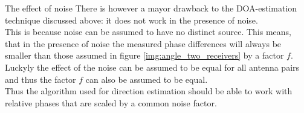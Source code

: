 \begin{subchapter}{The effect of noise}
  There is however a mayor drawback to the DOA-estimation
  technique discussed above: it does not work in the presence of noise. \\

  This is because noise can be assumed to have no distinct source.
  This means, that in the presence of noise the measured phase differences
  will always be smaller than those assumed in figure \ref{img:angle_two_receivers}
  by a factor $f$.
  Luckyly the effect of the noise can be assumed to be equal for
  all antenna pairs and thus the factor $f$ can also be assumed to be equal. \\

  Thus the algorithm used for direction estimation
  should be able to work with relative phases that are
  scaled by a common noise factor.
\end{subchapter}

